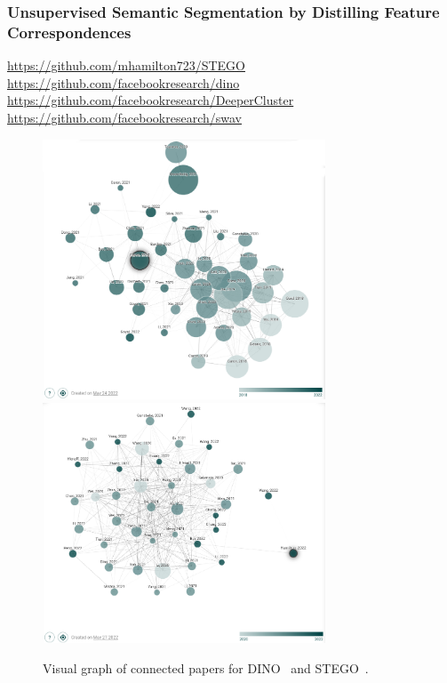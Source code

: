 \subsubsection{Unsupervised Semantic Segmentation by Distilling Feature Correspondences}
\url{https://github.com/mhamilton723/STEGO}\\
\url{https://github.com/facebookresearch/dino}\\
\url{https://github.com/facebookresearch/DeeperCluster}\\
\url{https://github.com/facebookresearch/swav}\\

\begin{figure}
    \centering
    \includegraphics[width=0.75\textwidth]{figs/dino.png}
    \includegraphics[width=0.75\textwidth]{figs/stego.png}
    \caption{Visual graph of connected papers for DINO~\cite{caron2021emerging} and STEGO~\cite{hamilton2022unsupervised}.}
    \label{fig:DINO_STEGO}%
\end{figure}

